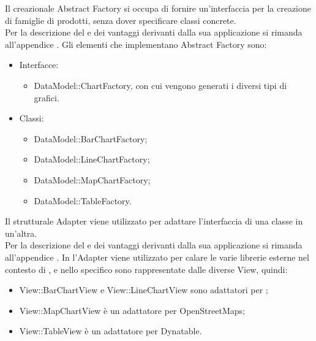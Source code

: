 			Il  creazionale Abstract Factory si occupa di fornire un'interfaccia per la creazione di famiglie di prodotti, senza dover specificare classi concrete. \\
			Per la descrizione del  e dei vantaggi derivanti dalla sua applicazione si rimanda all'appendice .
				Gli elementi che implementano Abstract Factory sono:
				\begin{itemize}
				\item Interfacce:
					\begin{itemize}
						\item DataModel::ChartFactory, con cui vengono generati i diversi tipi di grafici.
					\end{itemize}
				\item Classi:
					\begin{itemize}
						\item DataModel::BarChartFactory;
						\item DataModel::LineChartFactory;
						\item DataModel::MapChartFactory;
						\item DataModel::TableFactory.
					\end{itemize}
				\end{itemize}
			Il  strutturale Adapter viene utilizzato per adattare l'interfaccia di una classe in un'altra.\\
			Per la descrizione del  e dei vantaggi derivanti dalla sua applicazione si rimanda all'appendice .
				In  l'Adapter viene utilizzato per calare le varie librerie esterne nel contesto di \projectname{}, e nello specifico sono rappresentate dalle diverse View, quindi:
				\begin{itemize}
					\item View::BarChartView e View::LineChartView sono adattatori per ;
					\item View::MapChartView è un adattatore per OpenStreetMaps;
					\item View::TableView è un adattatore per Dynatable.
				\end{itemize}